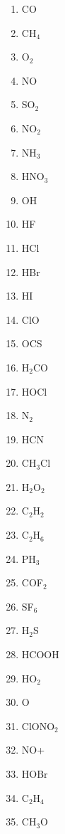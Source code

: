 \documentclass{article}
\begin{document}
\begin{itemize}
\begin{itemize}
\begin{enumerate}
                \item   CO
                \item   CH$_4$
                \item   O$_2$
                \item   NO
                \item   SO$_2$
                \item   NO$_2$
                \item   NH$_3$
                \item   HNO$_3$
                \item   OH
                \item   HF
                \item   HCl
                \item   HBr
                \item   HI
                \item   ClO
                \item   OCS
                \item   H$_2$CO		 
                \item   HOCl
                \item   N$_2$
                \item   HCN
                \item   CH$_3$Cl
                \item   H$_2$O$_2$
                \item   C$_2$H$_2$
                \item   C$_2$H$_6$
                \item   PH$_3$
                \item   COF$_2$
                \item   SF$_6$
                \item   H$_2$S
                \item   HCOOH
                \item   HO$_2$
                \item   O
                \item   ClONO$_2$
                \item   NO+
                \item   HOBr
                \item   C$_2$H$_4$
                \item   CH$_3$O
  \end{enumerate}
  \end{itemize}
  

\end{itemize}
\end{document}
